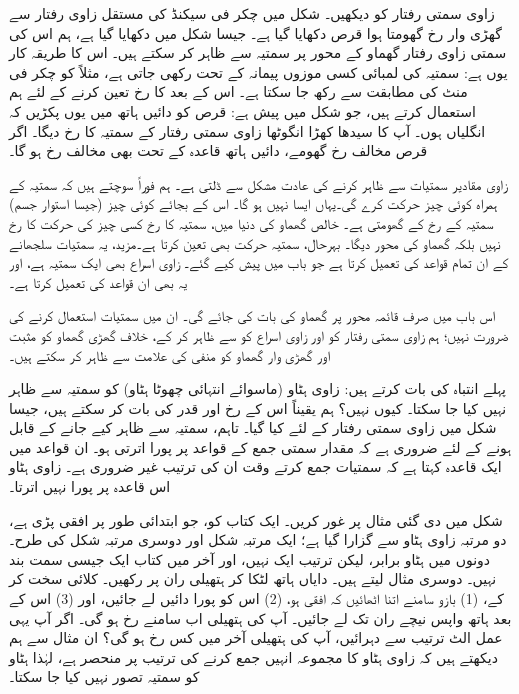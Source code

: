  زاوی سمتی رفتار کو دیکھیں۔ شکل  میں    چکر فی سیکنڈ  کی   مستقل زاوی رفتار   سے گھڑی وار  رخ  گھومتا ہوا قرص دکھایا گیا ہے۔ جیسا شکل  میں دکھایا گیا ہے، ہم اس کی سمتی زاوی  رفتار  گھماو کے محور پر سمتیہ    سے ظاہر کر سکتے ہیں۔ اس کا طریقہ کار یوں ہے: سمتیہ کی لمبائی   کسی موزوں پیمانہ کے تحت   رکھی جاتی ہے، مثلاً    کو  چکر فی منٹ  کی مطابقت سے رکھ  جا سکتا ہے۔ اس کے بعد  کا رخ تعین کرنے کے لئے ہم استعمال کرتے ہیں، جو شکل  میں پیش ہے: قرص کو دائیں ہاتھ میں یوں پکڑیں کہ  انگلیاں      ہوں۔ آپ کا سیدھا کھڑا انگوٹھا  زاوی سمتی رفتار کے سمتیہ کا رخ دیگا۔ اگر قرص مخالف رخ گھومے، دائیں ہاتھ قاعدہ کے تحت   بھی  مخالف رخ ہو گا۔

زاوی مقادیر       سمتیات سے ظاہر کرنے کی عادت مشکل سے  ڈلتی ہے۔ ہم فوراً سوچتے ہیں  کہ سمتیہ کے  ہمراہ  کوئی چیز  حرکت  کرے گی۔یہاں  ایسا نہیں ہو گا۔  اس کے بجائے کوئی چیز (جیسا استوار جسم) سمتیہ کے رخ کے   گھومتی ہے۔ خالص گھماو کی دنیا میں،  سمتیہ کا رخ کسی چیز کی حرکت کا رخ نہیں بلکہ  گھماو کی محور دیگا۔ بہرحال، سمتیہ حرکت بھی تعین کرتا ہے۔مزید، یہ   سمتیات  سلجھانے کے  ان تمام قواعد کی تعمیل کرتا ہے جو    باب  میں  پیش  کیے گئے۔ زاوی اسراع   بھی ایک  سمتیہ ہے، اور یہ بھی ان قواعد کی تعمیل کرتا ہے۔

اس باب میں صرف   قائمہ محور پر گھماو کی بات کی جائے گی۔ ان میں سمتیات استعمال کرنے کی ضرورت نہیں؛ ہم زاوی سمتی رفتار کو  اور زاوی اسراع کو  سے ظاہر کر  کے، خلاف گھڑی گھماو کو مثبت اور گھڑی وار گھماو کو منفی  کی علامت سے ظاہر کر سکتے ہیں۔

 پہلے  انتباہ کی بات کرتے ہیں: زاوی ہٹاو (ماسوائے  انتہائی چھوٹا  ہٹاو) کو سمتیہ سے ظاہر نہیں کیا جا سکتا۔ کیوں نہیں؟ ہم یقیناً اس کے رخ اور قدر کی بات کر سکتے ہیں، جیسا شکل  میں زاوی سمتی رفتار کے لئے کیا گیا۔ تاہم، سمتیہ سے ظاہر کیے جانے کے قابل ہونے کے لئے ضروری ہے کہ مقدار سمتی جمع کے قواعد پر پورا اترتی  ہو۔ ان قواعد میں ایک قاعدہ کہتا ہے کہ  سمتیات جمع کرتے وقت ان کی ترتیب غیر ضروری ہے۔ زاوی ہٹاو اس قاعدہ پر پورا نہیں اترتا۔

شکل  میں  دی گئی مثال پر غور کریں۔ ایک کتاب  کو، جو ابتدائی طور پر افقی پڑی ہے، دو مرتبہ  زاوی ہٹاو سے گزارا گیا ہے؛ ایک مرتبہ شکل    اور دوسری مرتبہ شکل  کی طرح۔  دونوں  میں ہٹاو  برابر، لیکن  ترتیب ایک نہیں، اور  آخر میں کتاب  ایک جیسی سمت بند نہیں۔ دوسری مثال لیتے ہیں۔ دایاں ہاتھ لٹکا کر ہتھیلی  ران پر رکھیں۔ کلائی سخت  کر کے،  (1)  بازو   سامنے اتنا اٹھائیں   کہ افقی ہو، (2)  اس کو پورا  دائیں لے جائیں، اور (3) اس کے بعد ہاتھ واپس نیچے ران تک لے جائیں۔ آپ کی ہتھیلی اب سامنے رخ ہو گی۔ اگر آپ یہی عمل الٹ ترتیب سے دہرائیں، آپ کی ہتھیلی  آخر میں کس رخ ہو گی؟ ان مثال سے ہم دیکھتے ہیں کہ زاوی  ہٹاو  کا مجموعہ انہیں جمع کرنے کی   ترتیب پر منحصر ہے، لہٰذا  ہٹاو کو سمتیہ تصور نہیں کیا جا سکتا۔

